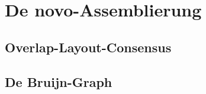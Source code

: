 \section{De novo-Assemblierung}

\subsection{Overlap-Layout-Consensus}

\subsection{De Bruijn-Graph}

